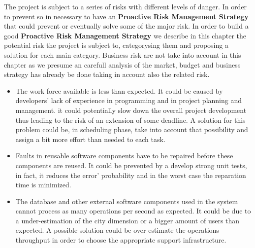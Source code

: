 
The project is subject to a series of risks with different levels of danger.
In order to prevent so in necessary to have an \textbf{Proactive Risk Management Strategy} that could prevent or eventually solve some
of the major risk. In order to build a good \textbf{Proactive Risk Management Strategy} we describe in this chapter the potential risk
the project is subject to, categorysing them and proposing a solution for each main category. Business risk are not take into account
in this chapter as we presume an carefull analysis of the market, budget and business strategy has already be done taking in account also
the related risk.
\begin{itemize}
      \begin{itemize}
        \item The work force available is less than expected. It could be caused by developers’ lack of experience in programming and in project planning and management.
        it could potentially slow down the overall project development thus leading to the risk of an extension of some deadline. A solution for this problem could be,
        in scheduling phase, take into account that possibility and assign a bit more effort than needed to each task.
      \end{itemize}
      \begin{itemize}
        \item Faults in reusable software components have to be repaired before these components are reused. It could be prevented by a
        develop strong unit tests, in fact, it reduces the error' probability and in the worst case the reparation time is minimized.
        \item The database and other external software components used in the system cannot process as many operations per second as expected. It could be due to
        a under-estimation of the city dimension or a bigger amount of users than expected. A possible solution could be over-estimate the operations throughput in order to choose the appropriate support infrastructure.
      \end{itemize}
\end{itemize}
